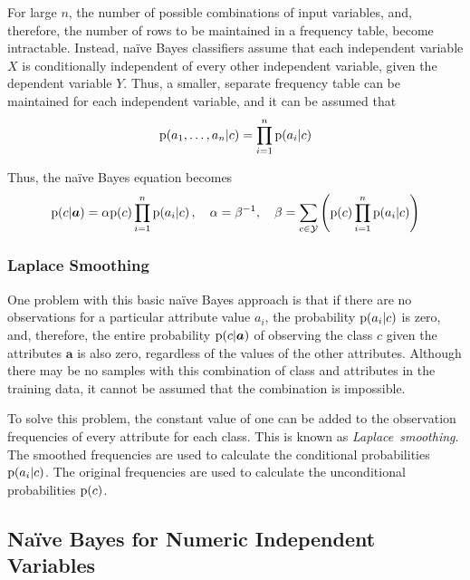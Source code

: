 For large \( n \), the number of possible combinations of input variables, and, therefore, the number of rows to be maintained in a frequency table, become intractable.
Instead, na\"{i}ve Bayes classifiers assume that each independent variable \( X \) is conditionally independent of every other independent variable, given the dependent variable \( Y \).
Thus, a smaller, separate frequency table can be maintained for each independent variable, and it can be assumed that
\begin{equation*}
  \mathrm{p}\!\left( a_{1}, \ldots, a_{n} \vert c \right) = \prod_{i=1}^{n} \mathrm{p}\!\left( a_{i} \vert c \right)
\end{equation*}

Thus, the na\"{i}ve Bayes equation becomes
\begin{equation*}
  \mathrm{p}\!\left( c \vert \boldsymbol{a} \right) = \alpha \mathrm{p}\!\left( c \right) \prod_{i=1}^{n} \mathrm{p}\!\left( a_{i} \vert c \right), \quad \alpha = \beta^{-1}, \quad \beta = \sum_{c \in \mathcal{Y}} \left( \mathrm{p}\!\left( c \right) \prod_{i=1}^{n} \mathrm{p}\!\left( a_{i} \vert c \right) \right)
\end{equation*}

\subsubsection{Laplace Smoothing}

One problem with this basic na\"{i}ve Bayes approach is that if there are no observations for a particular attribute value \( a_{i} \), the probability \( \mathrm{p}\!\left( a_{i} \vert c \right) \) is zero, and, therefore, the entire probability \( \mathrm{p}\!\left( c \vert \boldsymbol{a} \right) \) of observing the class \( c \) given the attributes \( \boldsymbol{a} \) is also zero, regardless of the values of the other attributes.
Although there may be no samples with this combination of class and attributes in the training data, it cannot be assumed that the combination is impossible.

To solve this problem, the constant value of one can be added to the observation frequencies of every attribute for each class.
This is known as \emph{Laplace~smoothing}.
The smoothed frequencies are used to calculate the conditional probabilities \( \mathrm{p}\!\left( a_{i} \vert c \right) \).
The original frequencies are used to calculate the unconditional probabilities \( \mathrm{p}\!\left( c \right) \).

\subsection{Na\"{i}ve Bayes for Numeric Independent Variables}

